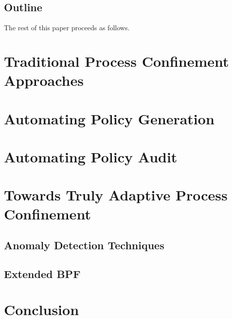 \documentclass[dvipsnames, 12pt]{article}
\begin{document}
\subsection{Outline}

The rest of this paper proceeds as follows. 

\section{Traditional Process Confinement Approaches}

\section{Automating Policy Generation}

\section{Automating Policy Audit}

\section{Towards Truly Adaptive Process Confinement}

\subsection{Anomaly Detection Techniques}

\subsection{Extended BPF}

\section{Conclusion}


\nocite{*} %
\clearpage
\printbibliography
\end{document}
